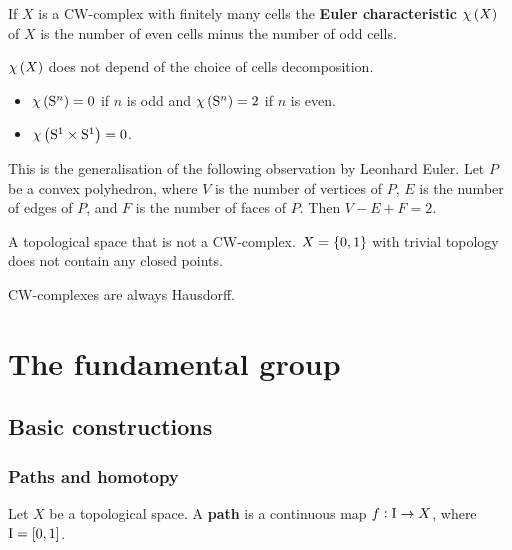 \begin{definition*}
If $ X $ is a CW-complex with finitely many cells the \textbf{Euler characteristic} $ \chi\br{X} $ of $ X $ is the number of even cells minus the number of odd cells.
\end{definition*}

\begin{fact*}
$ \chi\br{X} $ does not depend of the choice of cells decomposition.
\end{fact*}

\begin{example*}
\hfill
\begin{itemize}
\item $ \chi\br{\S^n} = 0 $ if $ n $ is odd and $ \chi\br{\S^n} = 2 $ if $ n $ is even.
\item $ \chi\br{\S^1 \times \S^1} = 0 $.
\end{itemize}
\end{example*}

This is the generalisation of the following observation by Leonhard Euler. Let $ P $ be a convex polyhedron, where $ V $ is the number of vertices of $ P $, $ E $ is the number of edges of $ P $, and $ F $ is the number of faces of $ P $. Then $ V - E + F = 2 $.

\begin{example*}
A topological space that is not a CW-complex. $ X = \cbr{0, 1} $ with trivial topology does not contain any closed points.
\end{example*}

\begin{fact*}
CW-complexes are always Hausdorff.
\end{fact*}

\pagebreak

\section{The fundamental group}

\subsection{Basic constructions}

\subsubsection{Paths and homotopy}

Let $ X $ be a topological space. A \textbf{path} is a continuous map $ f : \mathrm{I} \to X $, where $ \I = \sbr{0, 1} $.

